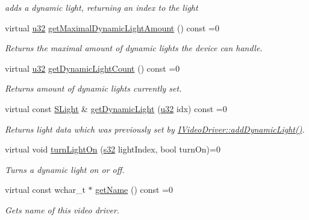 \begin{DoxyCompactItemize}
\begin{DoxyCompactList}\small\item\em adds a dynamic light, returning an index to the light \end{DoxyCompactList}\item 
virtual \hyperlink{namespaceirr_a0416a53257075833e7002efd0a18e804}{u32} \hyperlink{classirr_1_1video_1_1IVideoDriver_ab64a2875011c8870fd011a486f3503ec}{get\+Maximal\+Dynamic\+Light\+Amount} () const =0
\begin{DoxyCompactList}\small\item\em Returns the maximal amount of dynamic lights the device can handle. \end{DoxyCompactList}\item 
virtual \hyperlink{namespaceirr_a0416a53257075833e7002efd0a18e804}{u32} \hyperlink{classirr_1_1video_1_1IVideoDriver_a9b1e5de698f264a9f74a17bdba313138}{get\+Dynamic\+Light\+Count} () const =0
\begin{DoxyCompactList}\small\item\em Returns amount of dynamic lights currently set. \end{DoxyCompactList}\item 
virtual const \hyperlink{structirr_1_1video_1_1SLight}{S\+Light} \& \hyperlink{classirr_1_1video_1_1IVideoDriver_a9eb9ee246e85a56300031f7d7516054e}{get\+Dynamic\+Light} (\hyperlink{namespaceirr_a0416a53257075833e7002efd0a18e804}{u32} idx) const =0
\begin{DoxyCompactList}\small\item\em Returns light data which was previously set by \hyperlink{classirr_1_1video_1_1IVideoDriver_a813a39352eae26c4d30b5882618639be}{I\+Video\+Driver\+::add\+Dynamic\+Light()}. \end{DoxyCompactList}\item 
virtual void \hyperlink{classirr_1_1video_1_1IVideoDriver_a3c26904f7d1bf0e37d51fe71562346a0}{turn\+Light\+On} (\hyperlink{namespaceirr_ac66849b7a6ed16e30ebede579f9b47c6}{s32} light\+Index, bool turn\+On)=0
\begin{DoxyCompactList}\small\item\em Turns a dynamic light on or off. \end{DoxyCompactList}\item 
virtual const wchar\+\_\+t $\ast$ \hyperlink{classirr_1_1video_1_1IVideoDriver_a87ca51832295b2dceaa1e258daf863f1}{get\+Name} () const =0
\begin{DoxyCompactList}\small\item\em Gets name of this video driver. \end{DoxyCompactList}\item 

\end{DoxyCompactItemize}

